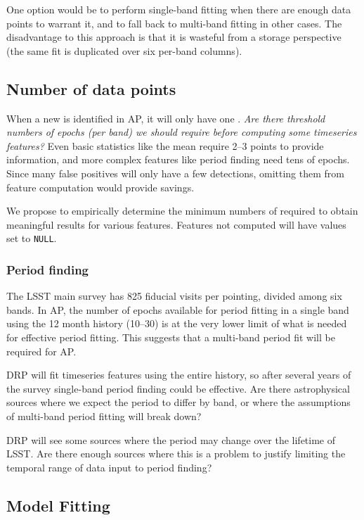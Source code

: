 \documentclass[DM,authoryear,toc]{lsstdoc}
\begin{document}
One option would be to perform single-band fitting when there are enough data points to warrant it, and to fall back to multi-band fitting in other cases.
The disadvantage to this approach is that it is wasteful from a storage perspective (the same fit is duplicated over six per-band columns).


\subsection{Number of data points}

When a new \DIAObject is identified in AP, it will only have one \DIASource.
\textit{Are there threshold numbers of epochs (per band) we should require before computing some timeseries features?}
Even basic statistics like the mean require 2--3 points to provide information, and more complex features like period finding need tens of epochs.
Since many false positives will only have a few detections, omitting them from feature computation would provide savings.

We propose to empirically determine the minimum numbers of \DIASources required to obtain meaningful results for various features.
Features not computed will have values set to \texttt{NULL}.

\subsubsection{Period finding}

The LSST main survey has 825 fiducial visits per pointing, divided among six bands.
In AP, the number of epochs available for period fitting in a single band using the 12 month \DIASource history (10--30) is at the very lower limit of what is needed for effective period fitting.
This suggests that a multi-band period fit will be required for AP.

DRP will fit timeseries features using the entire \DIASource history, so after several years of the survey single-band period finding could be effective.
Are there astrophysical sources where we expect the period to differ by band, or where the assumptions of multi-band period fitting will break down?

DRP will see some sources where the period may change over the lifetime of LSST.
Are there enough sources where this is a problem to justify limiting the temporal range of data input to period finding?


\subsection{Model Fitting}
\end{document}
